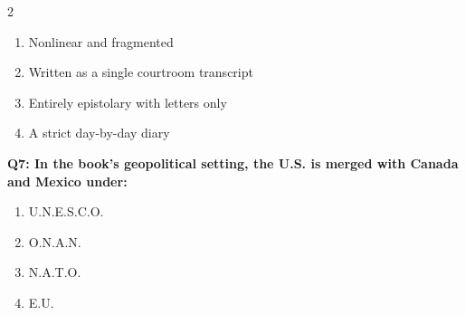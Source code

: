 \documentclass[10pt]{article}
\begin{document}
\begin{multicols}{2}
\begin{enumerate}[label=\arabic*.]
\item Nonlinear and fragmented
\item Written as a single courtroom transcript
\item Entirely epistolary with letters only
\item A strict day-by-day diary
\end{enumerate}
\textbf{Q7: In the book's geopolitical setting, the U.S. is merged with Canada and Mexico under:}

\begin{enumerate}[label=\arabic*.]
\item U.N.E.S.C.O.
\item O.N.A.N.
\item N.A.T.O.
\item E.U.
\end{enumerate}
\end{multicols}

\newpage
\end{document}
